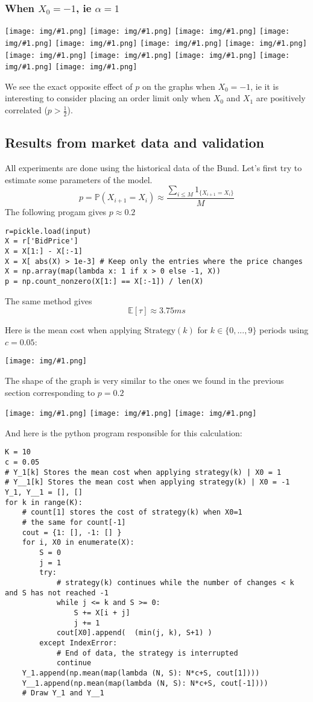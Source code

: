 \documentclass{article}
\newcommand{\IMG}[1] { \texttt{[image: img/\#1.png]} }
\newcommand{\IMGG}[1] { \texttt{[image: img/\#1.png]} }
\newcommand{\IMGC}[1] {
\begin{center} \texttt{[image: img/\#1.png]} \end{center}
 }
\begin{document}
\newpage

\subsubsection*{When $X_0 = -1$, ie $\alpha=1$}

\begin{center}

\IMGG{legend}
\IMG{11} 
\IMG{12} 
\IMG{13} 
\IMG{14} 
\IMG{15} 
\IMG{16} 
\IMG{17} 
\IMG{18} 
\IMG{19} 
\IMG{20}
\IMG{21}
\end{center}

We see the exact opposite effect of $p$ on the graphs when $X_0=-1$, ie it is interesting to consider placing an order limit only when $X_0$ and $X_1$ are positively correlated ($p > \frac{1}{2}$). 

\newpage

\subsection{Results from market data and validation}
All experiments are done using the historical data of the Bund. Let's first try to estimate some parameters of the model.
$$ p = \mathbb{P}(X_{i+1} = X_i)  \approx \frac{ \sum_{i \leq M} 1_{ \{X_{i+1} = X_i \} } }{M} $$
The following progam gives $p \approx 0.2$

\begin{verbatim}
r=pickle.load(input)
X = r['BidPrice']
X = X[1:] - X[:-1]
X = X[ abs(X) > 1e-3] # Keep only the entries where the price changes
X = np.array(map(lambda x: 1 if x > 0 else -1, X))
p = np.count_nonzero(X[1:] == X[:-1]) / len(X)
\end{verbatim}
The same method gives $$\mathbb{E}[ \tau ] \approx 3.75 ms$$

Here is the mean cost when applying $\text{Strategy}(k)$ for $k \in \{0, ... ,9 \}$ periods using $c=0.05$:
\IMGC{esp_market}

The shape of the graph is very similar to the ones we found in the previous section corresponding to $p = 0.2$
\begin{center}
\IMGG{legend}
\IMG{2}
\IMG{13}
\end{center}

And here is the python program responsible for this calculation:
\begin{verbatim}
K = 10
c = 0.05
# Y_1[k] Stores the mean cost when applying strategy(k) | X0 = 1
# Y__1[k] Stores the mean cost when applying strategy(k) | X0 = -1
Y_1, Y__1 = [], []
for k in range(K):
	# count[1] stores the cost of strategy(k) when X0=1
	# the same for count[-1]
	cout = {1: [], -1: [] } 
	for i, X0 in enumerate(X):
		S = 0
		j = 1
		try:
			# strategy(k) continues while the number of changes < k and S has not reached -1
			while j <= k and S >= 0:
				S += X[i + j]
				j += 1
			cout[X0].append(  (min(j, k), S+1) )
		except IndexError:
			# End of data, the strategy is interrupted
			continue				
	Y_1.append(np.mean(map(lambda (N, S): N*c+S, cout[1])))
	Y__1.append(np.mean(map(lambda (N, S): N*c+S, cout[-1])))
	# Draw Y_1 and Y__1
\end{verbatim}
\newpage
\end{document}
